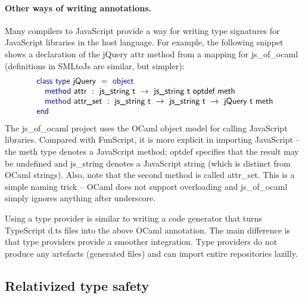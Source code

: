 \documentclass[submission,copyright,creativecommons]{eptcs}
\newcommand{\kvd}[1]{\textnormal{\textcolor{kvdclr}{\sffamily #1}}}
\newcommand{\ident}[1]{\textnormal{\sffamily #1}}
\begin{document}
\vspace{-1em}
\paragraph{Other ways of writing annotations.}
Many compilers to JavaScript provide a way for writing type signatures for JavaScript
libraries in the host language. For example, the following snippet shows a declaration of the
jQuery \ident{attr} method from a mapping for js\_of\_ocaml \cite{js_ocmal} (definitions in 
SMLtoJs \cite{js_sml} are similar, but simpler):
%
\begin{equation*}
\begin{array}{l}
 \kvd{class type}~\ident{jQuery}~=~\kvd{object} \\
 \quad \kvd{method}~\ident{attr}~:~\ident{js\_string t} ~\rightarrow~ \ident{js\_string t optdef meth} \\
 \quad \kvd{method}~\ident{attr\_set}~:~\ident{js\_string t} ~\rightarrow~ \ident{js\_string t} ~\rightarrow~ \ident{jQuery t meth} \\
 \kvd{end}
\end{array}
\end{equation*}
%
The js\_of\_ocaml project uses the OCaml object model for calling JavaScript libraries. 
Compared with FunScript, it is more explicit in importing JavaScript -- the \ident{meth}
type denotes a JavaScript method; \ident{optdef} specifies that the result may be 
undefined and \ident{js\_string} denotes a JavaScript string (which is distinct from OCaml
strings). Also, note that the second method is called \ident{attr\_set}. This is a simple
naming trick -- OCaml does not support overloading and js\_of\_ocaml simply ignores anything
after underscore.

Using a type provider is similar to writing a code generator that turns TypeScript 
\textcolor{strclr}{\ttfamily d.ts} files into the above OCaml annotation. The main difference
is that type providers provide a smoother integration. Type providers do not produce any artefacts
(generated files) and can import entire repositories lazilly.


\subsection{Relativized type safety}
\label{sec:tp-relative}
\end{document}
